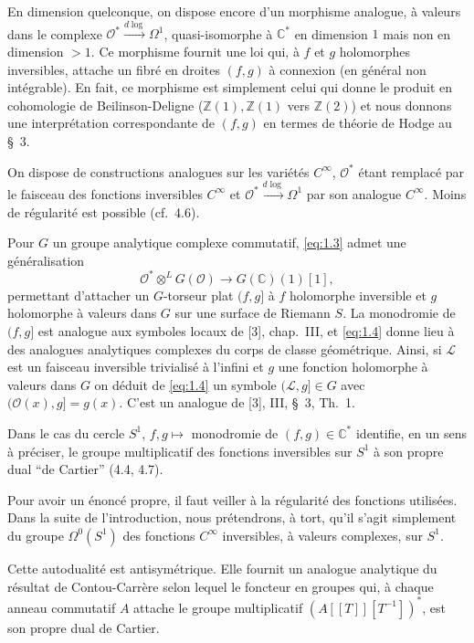 \documentclass[12pt,a4paper]{article}
\theoremstyle{plain}
\theoremstyle{definition}
\theoremstyle{remark}
\newcommand{\cO}{\mathcal{O}}
\newcommand{\Z}{\mathbb{Z}}
\newcommand{\C}{\mathbb{C}}
\newcommand{\cL}{\mathcal{L}}
\providecommand{\cL}{\mathcal{L}}
\providecommand{\cO}{\mathcal{O}}
\begin{document}
En dimension quelconque, on dispose encore d'un morphisme analogue, à valeurs
dans le complexe $\cO^* \xrightarrow{d\log} \Omega^1$, quasi-isomorphe à $\C^*$ en dimension $1$ mais non en dimension $>1$. Ce morphisme fournit une loi qui, à $f$ et $g$ holomorphes inversibles, attache
un fibré en droites $(f,g)$ à connexion (en général non intégrable). En fait, ce morphisme
est simplement celui qui donne le produit en cohomologie de Beilinson-Deligne ($\Z(1), \Z(1)$
vers $\Z(2)$) et nous donnons une interprétation correspondante de $(f,g)$ en termes de
théorie de Hodge au \S~3.

On dispose de constructions analogues sur les variétés $C^\infty$, $\cO^*$ étant remplacé par
le faisceau des fonctions inversibles $C^\infty$ et $\cO^* \xrightarrow{d\log} \Omega^1$ par son analogue $C^\infty$. Moins de
régularité est possible (cf.~4.6).

Pour $G$ un groupe analytique complexe commutatif, \eqref{eq:1.3} admet une généralisation
\begin{equation}\label{eq:1.4}
\cO^* \otimes^L G(\cO) \to G(\C)(1)[1],
\end{equation}
permettant d'attacher un $G$-torseur plat $(f,g]$ à $f$ holomorphe inversible et $g$ holomorphe
à valeurs dans $G$ sur une surface de Riemann $S$. La monodromie de $(f,g]$ est analogue
aux symboles locaux de [3], chap.~III, et \eqref{eq:1.4} donne lieu à des analogues analytiques
complexes du corps de classe géométrique. Ainsi, si $\cL$ est un faisceau inversible trivialisé
à l'infini et $g$ une fonction holomorphe à valeurs dans $G$ on déduit de \eqref{eq:1.4} un symbole
$(\cL,g] \in G$ avec $(\cO(x), g] = g(x)$. C'est un analogue de [3], III, \S~3, Th.~1.

Dans le cas du cercle $S^1$, $f, g \mapsto {}$ monodromie de $(f,g) \in \C^*$ identifie, en un sens
à préciser, le groupe multiplicatif des fonctions inversibles sur $S^1$ à son propre dual ``de
Cartier'' (4.4, 4.7).

Pour avoir un énoncé propre, il faut veiller à la régularité des fonctions utilisées.
Dans la suite de l'introduction, nous prétendrons, à tort, qu'il s'agit simplement du
groupe $\Omega^0(S^1)$ des fonctions $C^\infty$ inversibles, à valeurs complexes, sur $S^1$.

Cette autodualité est antisymétrique. Elle fournit un analogue analytique du résultat
de Contou-Carrère selon lequel le foncteur en groupes qui, à chaque anneau commutatif $A$ attache le groupe multiplicatif $(A[[T]][T^{-1}])^*$, est son propre dual de Cartier.
\end{document}
